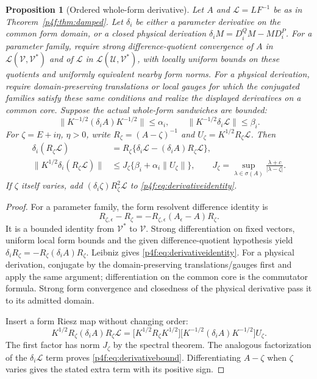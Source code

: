 \documentclass[11pt]{article}
\numberwithin{equation}{section}
\newtheorem{proposition}[theorem]{Proposition}
\theoremstyle{definition}
\theoremstyle{remark}
\begin{document}
\begin{proposition}[Ordered whole-form derivative]
\label{p4f:prop:derivatives}
Let $A$ and $\mathcal L=LF^{-1}$ be as in
Theorem~\ref{p4f:thm:damped}. Let $\delta_i$ be
either a parameter derivative on the common
form domain, or a closed physical derivation
$\delta_iM=D_i^QM-MD_i^P$.
For a parameter family, require strong difference-quotient convergence
of $A$ in $\mathcal L(\mathcal V,\mathcal V^*)$ and of $\mathcal L$
in $\mathcal L(\mathcal U,\mathcal V^*)$, with locally uniform bounds
on these quotients and uniformly equivalent nearby form norms.
For a physical derivation, require domain-preserving translations or
local gauges for which the conjugated families satisfy these same
conditions and realize the displayed derivatives on a common core.
Suppose the actual whole-form sandwiches are bounded:
\begin{equation}\label{p4f:eq:derivativecontracts}
 \|K^{-1/2}(\delta_iA)K^{-1/2}\|\le\alpha_i,\qquad
 \|K^{-1/2}\delta_i\mathcal L\|\le\beta_i .
\end{equation}
For $\zeta=E+i\eta$, $\eta>0$, write
$R_\zeta=(A-\zeta)^{-1}$ and
$U_\zeta=K^{1/2}R_\zeta\mathcal L$. Then
\begin{align}
 \delta_i(R_\zeta\mathcal L)
   &=R_\zeta\{\delta_i\mathcal L
                    -(\delta_iA)R_\zeta\mathcal L\},
                    \label{p4f:eq:derivativeidentity}\\
 \|K^{1/2}\delta_i(R_\zeta\mathcal L)\|
   &\le J_\zeta
          \{\beta_i+\alpha_i\|U_\zeta\|\},\qquad
 J_\zeta=\sup_{\lambda\in\sigma(A)}
                      \frac{\lambda+c}{|\lambda-\zeta|}.
                    \label{p4f:eq:derivativebound}
\end{align}
If $\zeta$ itself varies, add
$(\delta_i\zeta)R_\zeta^2\mathcal L$ to
\eqref{p4f:eq:derivativeidentity}.
\end{proposition}

\begin{proof}
For a parameter family, the form resolvent
difference identity is
\[
 R_{\zeta,\epsilon}-R_\zeta
   =-R_{\zeta,\epsilon}(A_\epsilon-A)R_\zeta.
\]
It is a bounded identity from $\mathcal V^*$
to $\mathcal V$. Strong differentiation on
fixed vectors, uniform local form bounds and
the given difference-quotient hypothesis yield
$\delta_iR_\zeta=-R_\zeta(\delta_iA)R_\zeta$.
Leibniz gives \eqref{p4f:eq:derivativeidentity}.
For a physical derivation, conjugate by the
domain-preserving translations/gauges first
and apply the same argument; differentiation
on the common core is the commutator formula.
Strong form convergence and closedness of the
physical derivative pass it to its admitted domain.

Insert a form Riesz map without changing order:
\[
 K^{1/2}R_\zeta(\delta_iA)R_\zeta\mathcal L
 =\big[K^{1/2}R_\zeta K^{1/2}\big]
  \big[K^{-1/2}(\delta_iA)K^{-1/2}\big]U_\zeta .
\]
The first factor has norm $J_\zeta$ by the
spectral theorem. The analogous factorization
of the $\delta_i\mathcal L$ term proves
\eqref{p4f:eq:derivativebound}. Differentiating
$A-\zeta$ when $\zeta$ varies gives the stated
extra term with its positive sign.
\end{proof}
\end{document}
